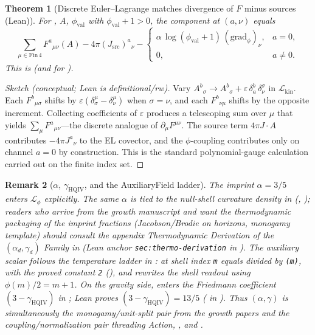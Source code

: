 \documentclass[11pt]{amsart}
\newtheorem{theorem}{Theorem}[section]
\newtheorem{remark}[theorem]{Remark}
\begin{document}
\begin{theorem}[Discrete Euler--Lagrange matches divergence of \(F\) minus sources (Lean)]
\label{thm:EL}
For , \(A\), \(\phi_{\mathrm{val}}\) with \(\phi_{\mathrm{val}}+1>0\), the component  at \((a,\nu)\) equals
\[
\sum_{\mu\in \mathrm{Fin}\,4} F^a{}_{\mu\nu}(A) - 4\pi (J_{\mathrm{src}})^a{}_\nu
-\begin{cases}
\alpha\,\log(\phi_{\mathrm{val}}+1)\,(\mathrm{grad}_\phi)_\nu, & a=0,\\
0, & a\neq 0 .
\end{cases}
\]
This is  (and  for ).
\end{theorem}

\begin{proof}[Sketch (conceptual; Lean is definitional/rw)]
Vary \(A^b{}_\sigma\to A^b{}_\sigma+\varepsilon\,\delta^b_a\,\delta^\sigma_\nu\) in \(\mathcal{L}_{\mathrm{kin}}\). Each \(F^b{}_{\mu\sigma}\) shifts by \(\varepsilon(\delta^\mu_\sigma-\delta^\mu_\nu)\) when \(\sigma=\nu\), and each \(F^b{}_{\nu\mu}\) shifts by the opposite increment. Collecting coefficients of \(\varepsilon\) produces a telescoping sum over \(\mu\) that yields \(\sum_\mu F^a{}_{\mu\nu}\)---the discrete analogue of \(\partial_\mu F^{\mu\nu}\). The source term \(4\pi J\!\cdot\!A\) contributes \(-4\pi J^a{}_\nu\) to the EL covector, and the \(\phi\)-coupling contributes only on channel \(a=0\) by construction. This is the standard polynomial-gauge calculation carried out on the finite index set.
\end{proof}

\begin{remark}[\(\alpha\), \(\gamma_{\mathrm{HQIV}}\), and the AuxiliaryField ladder]
The imprint \(\alpha=3/5\) enters \(\mathcal{L}_\phi\) explicitly. The same \(\alpha\) is tied to the null-shell curvature density in  (, ); readers who arrive from the growth manuscript and want the thermodynamic packaging of the imprint fractions (Jacobson/Brodie on horizons, monogamy template) should consult the appendix \emph{Thermodynamic Derivation of the \((\alpha_d,\gamma_d)\) Family} in \cite{hqiv-3d-growth-paper} (Lean anchor \texttt{sec:thermo-derivation} in ). The auxiliary scalar follows the temperature ladder in :  at shell index \texttt{m} equals  divided by \texttt{(m)}, with  the proved constant \texttt{2} (), and  rewrites the shell readout using \(\phi(m)/2=m+1\). On the gravity side,  enters the Friedmann coefficient \((3-\gamma_{\mathrm{HQIV}})\) in ; Lean proves \((3-\gamma_{\mathrm{HQIV}})=13/5\) ( in ). Thus \((\alpha,\gamma)\) is simultaneously the monogamy/unit-split pair from the growth papers and the coupling/normalization pair threading Action, , and .
\end{remark}
\end{document}
